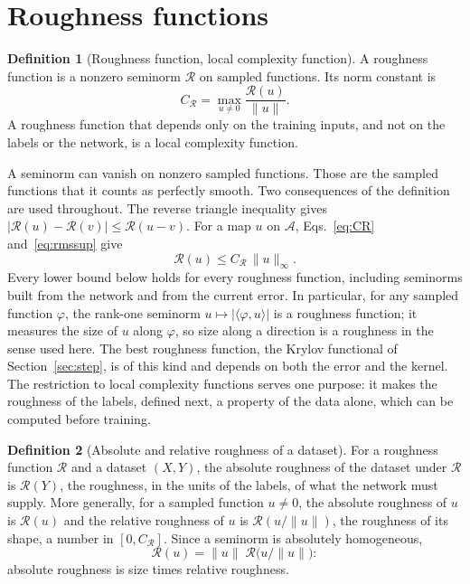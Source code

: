 \documentclass[11pt]{article}
\theoremstyle{definition}
\newtheorem{definition}{Definition}
\theoremstyle{remark}
\newcommand{\Aset}{\mathcal{A}}          %
\newcommand{\supA}[1]{\|#1\|_{\infty}}
\newcommand{\Rgh}{\mathcal{R}}           %
\newcommand{\CR}{C_{\Rgh}}
\newcommand{\ip}[2]{\langle #1,#2\rangle}
\begin{document}
\section{Roughness functions}\label{sec:seminorm}

\begin{definition}[Roughness function, local complexity function]\label{def:lcf}
A roughness function is a nonzero seminorm $\Rgh$ on sampled functions.
Its norm constant is
\begin{equation}\label{eq:CR}
\CR = \max_{u\neq 0}\frac{\Rgh(u)}{\|u\|}.
\end{equation}
A roughness function that depends only on the training inputs, and not on the labels or the network, is a local complexity function.
\end{definition}

A seminorm can vanish on nonzero sampled functions.
Those are the sampled functions that it counts as perfectly smooth.
Two consequences of the definition are used throughout.
The reverse triangle inequality gives $|\Rgh(u) - \Rgh(v)| \le \Rgh(u - v)$.
For a map $u$ on $\Aset$, Eqs.~\eqref{eq:CR} and~\eqref{eq:rmssup} give
\begin{equation}\label{eq:Rsup}
\Rgh(u) \le \CR\,\supA{u}.
\end{equation}
Every lower bound below holds for every roughness function, including seminorms built from the network and from the current error.
In particular, for any sampled function $\varphi$, the rank-one seminorm $u \mapsto |\ip{\varphi}{u}|$ is a roughness function; it measures the size of $u$ along $\varphi$, so size along a direction is a roughness in the sense used here.
The best roughness function, the Krylov functional of Section~\ref{sec:step}, is of this kind and depends on both the error and the kernel.
The restriction to local complexity functions serves one purpose: it makes the roughness of the labels, defined next, a property of the data alone, which can be computed before training.

\begin{definition}[Absolute and relative roughness of a dataset]\label{def:absolute}
For a roughness function $\Rgh$ and a dataset $(X, Y)$, the absolute roughness of the dataset under $\Rgh$ is $\Rgh(Y)$, the roughness, in the units of the labels, of what the network must supply.
More generally, for a sampled function $u \neq 0$, the absolute roughness of $u$ is $\Rgh(u)$ and the relative roughness of $u$ is $\Rgh(u/\|u\|)$, the roughness of its shape, a number in $[0, \CR]$.
Since a seminorm is absolutely homogeneous,
\begin{equation}\label{eq:sizeshape}
\Rgh(u) = \|u\|\;\Rgh\big(u/\|u\|\big):
\end{equation}
absolute roughness is size times relative roughness.
\end{definition}
\end{document}
